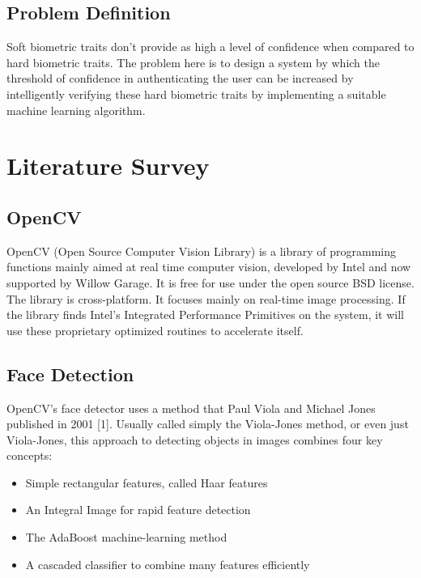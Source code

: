 \documentclass[12pt]{article}			%
\begin{document}
\subsection{ Problem Definition }
Soft biometric traits don’t provide as high a level of confidence when compared to hard biometric traits. The problem here is to design a system by which the threshold of confidence in authenticating the user can be increased by intelligently verifying these hard biometric traits by implementing a suitable machine learning algorithm.


\section{Literature Survey }


\subsection{ OpenCV }
OpenCV (Open Source Computer Vision Library) is a library of programming functions mainly aimed at real time computer vision, developed by Intel and now supported by Willow Garage. It is free for use under the open source BSD license. The library is cross-platform. It focuses mainly on real-time image processing. If the library finds Intel's Integrated Performance Primitives on the system, it will use these proprietary optimized routines to accelerate itself.

\subsection{ Face Detection }
OpenCV's face detector uses a method that Paul Viola and Michael Jones published in 2001 [1]. Usually called simply the Viola-Jones method, or even just Viola-Jones, this approach to detecting objects in images combines four key concepts:
\begin{itemize}
	\item{} Simple rectangular features, called Haar features
	\item{} An Integral Image for rapid feature detection
	\item{} The AdaBoost machine-learning method
	\item{} A cascaded classifier to combine many features efficiently
\end{itemize}
\end{document}
